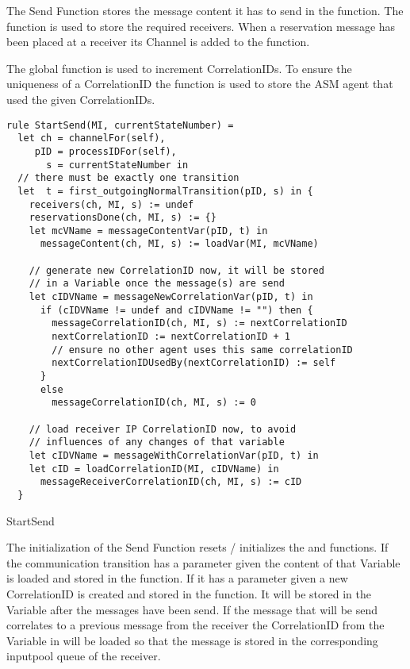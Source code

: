 The Send Function stores the message content it has to send in the
 function. The  function is
used to store the required receivers. When a reservation message has been
placed at a receiver its Channel is added to the 
function.

The global function  is used to increment
CorrelationIDs. To ensure the uniqueness of a CorrelationID the
 function is used to store the ASM agent
that used the given CorrelationIDs.


\begin{listing}[H]
\begin{verbatim}
rule StartSend(MI, currentStateNumber) =
  let ch = channelFor(self),
     pID = processIDFor(self),
       s = currentStateNumber in
  // there must be exactly one transition
  let  t = first_outgoingNormalTransition(pID, s) in {
    receivers(ch, MI, s) := undef
    reservationsDone(ch, MI, s) := {}
    let mcVName = messageContentVar(pID, t) in
      messageContent(ch, MI, s) := loadVar(MI, mcVName)

    // generate new CorrelationID now, it will be stored
    // in a Variable once the message(s) are send
    let cIDVName = messageNewCorrelationVar(pID, t) in
      if (cIDVName != undef and cIDVName != "") then {
        messageCorrelationID(ch, MI, s) := nextCorrelationID
        nextCorrelationID := nextCorrelationID + 1
        // ensure no other agent uses this same correlationID
        nextCorrelationIDUsedBy(nextCorrelationID) := self
      }
      else
        messageCorrelationID(ch, MI, s) := 0

    // load receiver IP CorrelationID now, to avoid
    // influences of any changes of that variable
    let cIDVName = messageWithCorrelationVar(pID, t) in
    let cID = loadCorrelationID(MI, cIDVName) in
      messageReceiverCorrelationID(ch, MI, s) := cID
  }
\end{verbatim}
\caption{StartSend}
\label{lst:shortasm:StartSend}
\end{listing}


The initialization of the Send Function resets / initializes the  and
 functions.
If the communication transition has a  parameter given the
content of that Variable is loaded and stored in the 
function. If it has a  parameter given
a new CorrelationID is created and stored in the  function.
It will be stored in the Variable after the messages have been send.
If the message that will be send correlates to a previous message from the receiver
the CorrelationID from the Variable in  will be loaded
so that the message is stored in the corresponding inputpool queue of the receiver.


